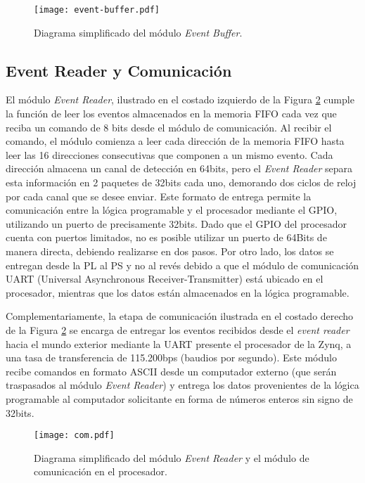 	\begin{figure}[H]
		\centering
		\texttt{[image: event-buffer.pdf]}
		\caption{Diagrama simplificado del módulo \textit{Event Buffer}.}
		\label{fig:event-buffer}
	\end{figure}
	
	\subsection{Event Reader y Comunicación}
	\label{sec:comm}
	El módulo \textit{Event Reader}, ilustrado en el costado izquierdo de la Figura \ref{fig:com} cumple la función de leer los eventos almacenados en la memoria FIFO cada vez que reciba un comando de 8 bits desde el módulo de comunicación. Al recibir el comando, el módulo comienza a leer cada dirección de la memoria FIFO hasta leer las 16 direcciones consecutivas que componen a un mismo evento. Cada dirección almacena un canal de detección en 64bits, pero el \textit{Event Reader} separa esta información en 2 paquetes de 32bits cada uno, demorando dos ciclos de reloj por cada canal que se desee enviar. Este formato de entrega permite la comunicación entre la lógica programable y el procesador mediante el GPIO, utilizando un puerto de precisamente 32bits. Dado que el GPIO del procesador cuenta con puertos limitados, no es posible utilizar un puerto de 64Bits de manera directa, debiendo realizarse en dos pasos. Por otro lado, los datos se entregan desde la PL al PS y no al revés debido a que el módulo de comunicación UART (Universal Asynchronous Receiver-Transmitter) está ubicado en el procesador, mientras que los datos están almacenados en la lógica programable.
	 
	Complementariamente, la etapa de comunicación ilustrada en el costado derecho de la Figura \ref{fig:com} se encarga de entregar los eventos recibidos desde el \textit{event reader} hacia el mundo exterior mediante la UART presente el procesador de la Zynq, a una tasa de transferencia de 115.200bps (baudios por segundo). Este módulo recibe comandos en formato ASCII desde un computador externo (que serán traspasados al módulo \textit{Event Reader}) y entrega los datos provenientes de la lógica programable al computador solicitante en forma de números enteros sin signo de 32bits.
	
	\begin{figure}[H]
		\centering
		\texttt{[image: com.pdf]}
		\caption{Diagrama simplificado del módulo \textit{Event Reader} y el módulo de comunicación en el procesador.}
		\label{fig:com}
	\end{figure}
	
